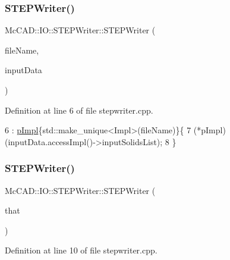 \subsubsection{\texorpdfstring{S\+T\+E\+P\+Writer()}{STEPWriter()}\hspace{0.1cm}{\footnotesize\ttfamily [1/6]}}
{\footnotesize\ttfamily Mc\+C\+A\+D\+::\+I\+O\+::\+S\+T\+E\+P\+Writer\+::\+S\+T\+E\+P\+Writer (\begin{DoxyParamCaption}\item[{const std\+::string \&}]{file\+Name,  }\item[{const \hyperlink{classMcCAD_1_1General_1_1InputData}{General\+::\+Input\+Data} \&}]{input\+Data }\end{DoxyParamCaption})}



Definition at line 6 of file stepwriter.\+cpp.


\begin{DoxyCode}
6                                                                                           : 
      \hyperlink{classMcCAD_1_1IO_1_1STEPWriter_af607286b2a18648c14ece6b8bc103db4}{pImpl}\{std::make\_unique<Impl>(fileName)\}\{
7   (*pImpl)(inputData.accessImpl()->inputSolidsList);
8 \}
\end{DoxyCode}
\mbox{\label{classMcCAD_1_1IO_1_1STEPWriter_a94aa76a6d70bb8b0c257481f8ecef176}} 
\subsubsection{\texorpdfstring{S\+T\+E\+P\+Writer()}{STEPWriter()}\hspace{0.1cm}{\footnotesize\ttfamily [2/6]}}
{\footnotesize\ttfamily Mc\+C\+A\+D\+::\+I\+O\+::\+S\+T\+E\+P\+Writer\+::\+S\+T\+E\+P\+Writer (\begin{DoxyParamCaption}\item[{const \hyperlink{classMcCAD_1_1IO_1_1STEPWriter}{S\+T\+E\+P\+Writer} \&}]{that }\end{DoxyParamCaption})}



Definition at line 10 of file stepwriter.\+cpp.


